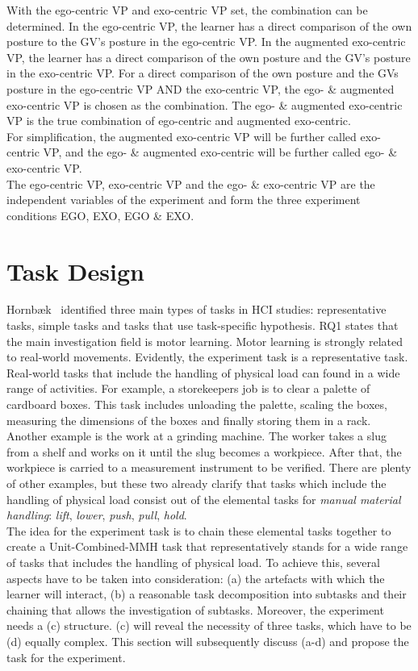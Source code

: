 With the ego-centric VP and exo-centric VP set, the combination can be determined. In the ego-centric VP, the learner has a direct comparison of the own posture to the GV's posture in the ego-centric VP. In the augmented exo-centric VP, the learner has a direct comparison of the own posture and the GV's posture in the exo-centric VP. For a direct comparison of the own posture and the GVs posture in the ego-centric VP AND the exo-centric VP, the ego- \& augmented exo-centric VP is chosen as the combination. The ego- \& augmented exo-centric VP is the true combination of ego-centric and augmented exo-centric.\\
For simplification, the augmented exo-centric VP will be further called exo-centric VP, and the ego- \& augmented exo-centric will be further called ego- \& exo-centric VP.\\
The ego-centric VP, exo-centric VP and the ego- \& exo-centric VP are the independent variables of the experiment and form the three experiment conditions EGO, EXO, EGO \& EXO.

\section{Task Design}
\label{sec:taskDesign}
Hornb\ae{}k~\cite{hornbaek} identified three main types of tasks in HCI studies: representative tasks, simple tasks and tasks that use task-specific hypothesis. RQ1 states that the main investigation field is motor learning. Motor learning is strongly related to real-world movements. Evidently, the experiment task is a representative task.\\
Real-world tasks that include the handling of physical load can found in a wide range of activities. For example, a storekeepers job is to clear a palette of cardboard boxes. This task includes unloading the palette, scaling the boxes, measuring the dimensions of the boxes and finally storing them in a rack. Another example is the work at a grinding machine. The worker takes a slug from a shelf and works on it until the slug becomes a workpiece. After that, the workpiece is carried to a measurement instrument to be verified. There are plenty of other examples, but these two already clarify that tasks which include the handling of physical load consist out of the elemental tasks for \textit{manual material handling}: \textit{lift}, \textit{lower}, \textit{push}, \textit{pull}, \textit{hold}.\\
The idea for the experiment task is to chain these elemental tasks together to create a Unit-Combined-MMH task that representatively stands for a wide range of tasks that includes the handling of physical load. To achieve this, several aspects have to be taken into consideration: (a) the artefacts with which the learner will interact, (b) a reasonable task decomposition into subtasks and their chaining that allows the investigation of subtasks. Moreover, the experiment needs a (c) structure. (c) will reveal the necessity of three tasks, which have to be (d) equally complex. This section will subsequently discuss (a-d) and propose the task for the experiment.

